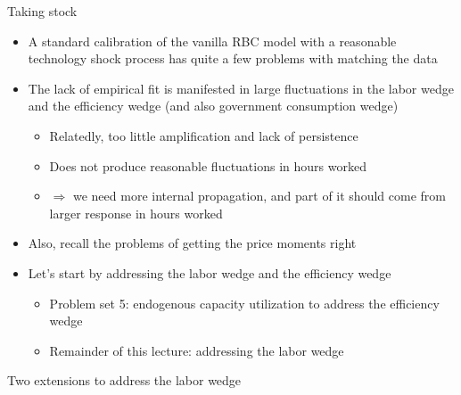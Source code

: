 \documentclass[9pt,xcolor={dvipsnames}]{beamer}
\newcommand{\bit}{\begin{itemize}}
\newcommand{\eit}{\end{itemize}}
\begin{document}
\begin{frame}{Taking stock}

\bit
\setlength\itemsep{1.5em}

\item A standard calibration of the vanilla RBC model with a reasonable technology shock process has quite a few problems with matching the data

\item The lack of empirical fit is manifested in large fluctuations in the labor wedge and the efficiency wedge (and also government consumption wedge)
\bit
\setlength\itemsep{0.5em}
	\item Relatedly, too little amplification and lack of persistence
	
	\item Does not produce reasonable fluctuations in hours worked
	
	\item $\Rightarrow$ we need more internal propagation, and part of it should come from larger response in hours worked
\eit

\item Also, recall the problems of getting the price moments right

\item Let's start by addressing the labor wedge and the efficiency wedge
\bit
\setlength\itemsep{0.5em}
	\item Problem set 5: endogenous capacity utilization to address the efficiency wedge
	
\item Remainder of this lecture: addressing the labor wedge
\eit


\eit

\end{frame}




\begin{frame}

\begin{center}
	\huge Two extensions to address the labor wedge \normalfont
\end{center}

\end{frame}
\end{document}
